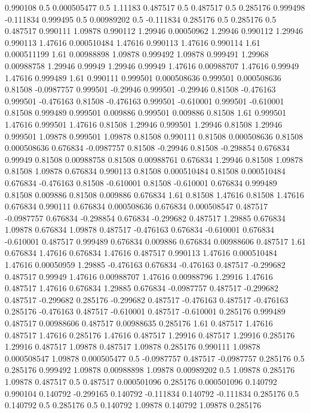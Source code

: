 0.990108 0.5
0.000505477 0.5
1.11183 0.487517
0.5 0.487517
0.5 0.285176
0.999498 -0.111834
0.999495 0.5
0.00989202 0.5
-0.111834 0.285176
0.5 0.285176
0.5 0.487517
0.990111 1.09878
0.990112 1.29946
0.00050962 1.29946
0.990112 1.29946
0.990113 1.47616
0.000510484 1.47616
0.990113 1.47616
0.990114 1.61
0.000511199 1.61
0.00988898 1.09878
0.999492 1.09878
0.999491 1.29968
0.00988758 1.29946
0.99949 1.29946
0.99949 1.47616
0.00988707 1.47616
0.99949 1.47616
0.999489 1.61
0.990111 0.999501
0.000508636 0.999501
0.000508636 0.81508
-0.0987757 0.999501
-0.29946 0.999501
-0.29946 0.81508
-0.476163 0.999501
-0.476163 0.81508
-0.476163 0.999501
-0.610001 0.999501
-0.610001 0.81508
0.999489 0.999501
0.009886 0.999501
0.009886 0.81508
1.61 0.999501
1.47616 0.999501
1.47616 0.81508
1.29946 0.999501
1.29946 0.81508
1.29946 0.999501
1.09878 0.999501
1.09878 0.81508
0.990111 0.81508
0.000508636 0.81508
0.000508636 0.676834
-0.0987757 0.81508
-0.29946 0.81508
-0.298854 0.676834
0.99949 0.81508
0.00988758 0.81508
0.00988761 0.676834
1.29946 0.81508
1.09878 0.81508
1.09878 0.676834
0.990113 0.81508
0.000510484 0.81508
0.000510484 0.676834
-0.476163 0.81508
-0.610001 0.81508
-0.610001 0.676834
0.999489 0.81508
0.009886 0.81508
0.009886 0.676834
1.61 0.81508
1.47616 0.81508
1.47616 0.676834
0.990111 0.676834
0.000508636 0.676834
0.000508547 0.487517
-0.0987757 0.676834
-0.298854 0.676834
-0.299682 0.487517
1.29885 0.676834
1.09878 0.676834
1.09878 0.487517
-0.476163 0.676834
-0.610001 0.676834
-0.610001 0.487517
0.999489 0.676834
0.009886 0.676834
0.00988606 0.487517
1.61 0.676834
1.47616 0.676834
1.47616 0.487517
0.990113 1.47616
0.000510484 1.47616
0.00050959 1.29885
-0.476163 0.676834
-0.476163 0.487517
-0.299682 0.487517
0.99949 1.47616
0.00988707 1.47616
0.00988796 1.29916
1.47616 0.487517
1.47616 0.676834
1.29885 0.676834
-0.0987757 0.487517
-0.299682 0.487517
-0.299682 0.285176
-0.299682 0.487517
-0.476163 0.487517
-0.476163 0.285176
-0.476163 0.487517
-0.610001 0.487517
-0.610001 0.285176
0.999489 0.487517
0.00988606 0.487517
0.00988635 0.285176
1.61 0.487517
1.47616 0.487517
1.47616 0.285176
1.47616 0.487517
1.29916 0.487517
1.29916 0.285176
1.29916 0.487517
1.09878 0.487517
1.09878 0.285176
0.990111 1.09878
0.000508547 1.09878
0.000505477 0.5
-0.0987757 0.487517
-0.0987757 0.285176
0.5 0.285176
0.999492 1.09878
0.00988898 1.09878
0.00989202 0.5
1.09878 0.285176
1.09878 0.487517
0.5 0.487517
0.000501096 0.285176
0.000501096 0.140792
0.990104 0.140792
-0.299165 0.140792
-0.111834 0.140792
-0.111834 0.285176
0.5 0.140792
0.5 0.285176
0.5 0.140792
1.09878 0.140792
1.09878 0.285176
